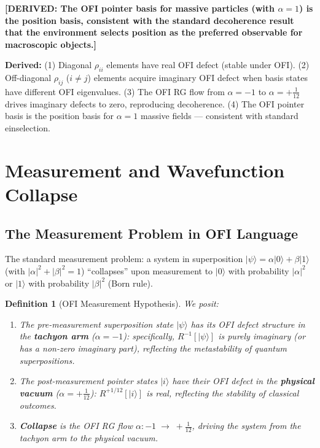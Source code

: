 \documentclass[12pt]{article}
\newtheorem{definition}[theorem]{Definition}
\theoremstyle{definition}
\newcommand{\DERIVED}[1]{\textcolor{derivedcolor}{\textbf{[DERIVED: #1]}}}
\begin{document}
\DERIVED{The OFI pointer basis for massive particles (with $\alpha=1$)
is the position basis, consistent with the standard decoherence result
that the environment selects position as the preferred observable for
macroscopic objects.}

\begin{tcolorbox}[resultbox, title={Summary of Section~\ref{sec:decoherence}}]
\textbf{Derived:}
(1) Diagonal $\rho_{ii}$ elements have real OFI defect (stable under OFI).
(2) Off-diagonal $\rho_{ij}$ ($i\neq j$) elements acquire imaginary OFI
defect when basis states have different OFI eigenvalues.
(3) The OFI RG flow from $\alpha=-1$ to $\alpha=+\tfrac{1}{12}$ drives
imaginary defects to zero, reproducing decoherence.
(4) The OFI pointer basis is the position basis for $\alpha=1$ massive
fields — consistent with standard einselection.
\end{tcolorbox}

\section{Measurement and Wavefunction Collapse}
\label{sec:measurement}

\subsection{The Measurement Problem in OFI Language}

The standard measurement problem: a system in superposition
$|\psi\rangle = \alpha|0\rangle + \beta|1\rangle$ (with $|\alpha|^2+|\beta|^2=1$)
``collapses'' upon measurement to $|0\rangle$ with probability $|\alpha|^2$
or $|1\rangle$ with probability $|\beta|^2$ (Born rule).

\begin{definition}[OFI Measurement Hypothesis]
\label{def:collapse}
We posit:
\begin{enumerate}[label=(\roman*),leftmargin=2em]
\item The \emph{pre-measurement} superposition state $|\psi\rangle$ has
  its OFI defect structure in the \textbf{tachyon arm}
  ($\alpha = -1$): specifically, $R^{-1}[|\psi\rangle]$ is purely
  imaginary (or has a non-zero imaginary part), reflecting the
  metastability of quantum superpositions.
\item The \emph{post-measurement} pointer states $|i\rangle$ have their
  OFI defect in the \textbf{physical vacuum}
  ($\alpha = +\tfrac{1}{12}$): $R^{+1/12}[|i\rangle]$ is real,
  reflecting the stability of classical outcomes.
\item \textbf{Collapse} is the OFI RG flow
  $\alpha: -1 \;\longrightarrow\; +\tfrac{1}{12}$,
  driving the system from the tachyon arm to the physical vacuum.
\end{enumerate}
\end{definition}
\end{document}
